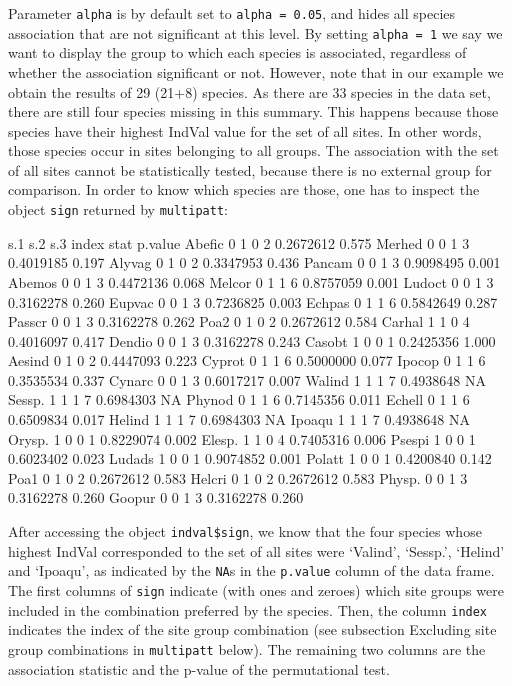 \documentclass[11pt,a4paper]{article}
\begin{document}
Parameter \texttt{alpha} is by default set to \texttt{alpha = 0.05}, and hides all species association that are not significant at this level. By setting \texttt{alpha = 1} we say we want to display the group to which each species is associated, regardless of whether the association significant or not. However, note that in our example we obtain the results of 29 (21+8) species. As there are 33 species in the data set, there are still four species missing in this summary. This happens because those species have their highest IndVal value for the set of all sites. In other words, those species occur in sites belonging to all groups. The association with the set of all sites cannot be statistically tested, because there is no external group for comparison. In order to know which species are those, one has to inspect the object \texttt{sign} returned by \texttt{multipatt}:
\begin{Schunk}
\begin{Soutput}
       s.1 s.2 s.3 index      stat p.value
Abefic   0   1   0     2 0.2672612   0.575
Merhed   0   0   1     3 0.4019185   0.197
Alyvag   0   1   0     2 0.3347953   0.436
Pancam   0   0   1     3 0.9098495   0.001
Abemos   0   0   1     3 0.4472136   0.068
Melcor   0   1   1     6 0.8757059   0.001
Ludoct   0   0   1     3 0.3162278   0.260
Eupvac   0   0   1     3 0.7236825   0.003
Echpas   0   1   1     6 0.5842649   0.287
Passcr   0   0   1     3 0.3162278   0.262
Poa2     0   1   0     2 0.2672612   0.584
Carhal   1   1   0     4 0.4016097   0.417
Dendio   0   0   1     3 0.3162278   0.243
Casobt   1   0   0     1 0.2425356   1.000
Aesind   0   1   0     2 0.4447093   0.223
Cyprot   0   1   1     6 0.5000000   0.077
Ipocop   0   1   1     6 0.3535534   0.337
Cynarc   0   0   1     3 0.6017217   0.007
Walind   1   1   1     7 0.4938648      NA
Sessp.   1   1   1     7 0.6984303      NA
Phynod   0   1   1     6 0.7145356   0.011
Echell   0   1   1     6 0.6509834   0.017
Helind   1   1   1     7 0.6984303      NA
Ipoaqu   1   1   1     7 0.4938648      NA
Orysp.   1   0   0     1 0.8229074   0.002
Elesp.   1   1   0     4 0.7405316   0.006
Psespi   1   0   0     1 0.6023402   0.023
Ludads   1   0   0     1 0.9074852   0.001
Polatt   1   0   0     1 0.4200840   0.142
Poa1     0   1   0     2 0.2672612   0.583
Helcri   0   1   0     2 0.2672612   0.583
Physp.   0   0   1     3 0.3162278   0.260
Goopur   0   0   1     3 0.3162278   0.260
\end{Soutput}
\end{Schunk}
After accessing the object \texttt{indval\$sign}, we know that the four species whose highest IndVal corresponded to the set of all sites were `Valind', `Sessp.', `Helind' and `Ipoaqu', as indicated by the \texttt{NA}s in the \texttt{p.value} column of the data frame. The first columns of \texttt{sign} indicate (with ones and zeroes) which site groups were included in the combination preferred by the species. Then, the column \texttt{index} indicates the index of the site group combination (see subsection Excluding site group combinations in \texttt{multipatt} below). The remaining two columns are the association statistic and the p-value of the permutational test.
\end{document}
